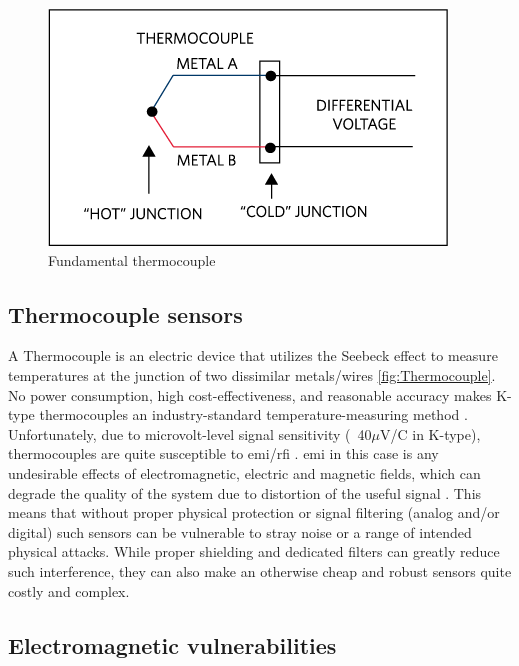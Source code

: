 \begin{figure} [h]
    \centering
    \includegraphics[width=\linewidth]{pictures/TC.png}
    \caption{Fundamental thermocouple \cite{Ismail17}}
    \label{fig:TCouple}
\end{figure}

\subsection{Thermocouple sensors}

A Thermocouple is an electric device that utilizes the Seebeck effect to measure temperatures at the junction of two dissimilar metals/wires \cref{fig:Thermocouple}. No power consumption, high cost-effectiveness, and reasonable accuracy makes K-type thermocouples an industry-standard temperature-measuring method \cite{Duff10}. Unfortunately, due to microvolt-level signal sensitivity (~40$\mu$V/\textdegree{}C in K-type), thermocouples are quite susceptible to \ac{emi}/\ac{rfi} \cite{Smalcerz2013,Astm93}. \ac{emi} in this case is any undesirable effects of electromagnetic, electric and magnetic fields, which can degrade the quality of the system due to distortion of the useful signal \cite{Getz96}. This means that without proper physical protection or signal filtering (analog and/or digital) such sensors can be vulnerable to stray noise or a range of intended physical attacks. While proper shielding and dedicated filters can greatly reduce such interference, they can also make an otherwise cheap and robust sensors quite costly and complex. 

\subsection{Electromagnetic vulnerabilities}

